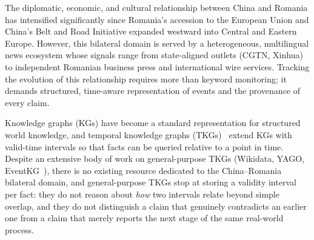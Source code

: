 \documentclass[conference]{IEEEtran}
\begin{document}
The diplomatic, economic, and cultural relationship between China and Romania
has intensified significantly since Romania's accession to the European
Union and China's Belt and Road Initiative expanded westward into Central and
Eastern Europe. However, this bilateral domain is served by a heterogeneous,
multilingual news ecosystem whose signals range from state-aligned outlets
(CGTN, Xinhua) to independent Romanian business press and international
wire services. Tracking the evolution of this relationship requires more
than keyword monitoring; it demands structured, time-aware representation
of events and the provenance of every claim.

Knowledge graphs (KGs) have become a standard representation for structured
world knowledge, and temporal knowledge graphs (TKGs)~\cite{trivedi2019dyrep}
extend KGs with valid-time intervals so that facts can be queried relative
to a point in time. Despite an extensive body of work on general-purpose
TKGs (Wikidata, YAGO, EventKG~\cite{gottschalk2019eventkg}), there is no
existing resource dedicated to the China--Romania bilateral domain, and
general-purpose TKGs stop at storing a validity interval per fact: they do
not reason about \emph{how} two intervals relate beyond simple overlap, and
they do not distinguish a claim that genuinely contradicts an earlier one
from a claim that merely reports the next stage of the same real-world
process.
\end{document}
